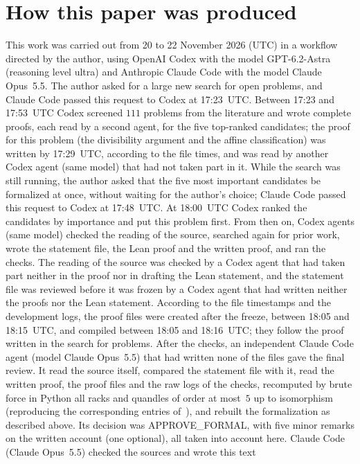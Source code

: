 \documentclass[11pt]{article}
\theoremstyle{definition}
\theoremstyle{remark}
\begin{document}
\section*{How this paper was produced}
This work was carried out from 20 to 22 November 2026 (UTC) in a workflow directed by
the author, using OpenAI Codex with the model GPT-6.2-Astra (reasoning level
ultra) and Anthropic Claude Code with the model Claude Opus~5.5. The author
asked for a large new search for open problems, and Claude Code passed this
request to Codex at 17:23~UTC. Between 17:23 and 17:53~UTC Codex screened
$111$ problems from the literature and wrote complete proofs, each read by a
second agent, for the five top-ranked candidates; the
proof for this problem (the divisibility argument and the affine
classification) was written by 17:29~UTC, according to the file times, and was
read by another Codex agent (same model) that had not taken part in it. While
the search was still running, the author asked that the five most important
candidates be formalized at once, without waiting for the author's choice;
Claude Code passed this request to Codex at 17:48~UTC. At 18:00~UTC Codex
ranked the candidates by importance and put this problem first. From then on,
Codex agents (same model) checked the reading of the source, searched again for
prior work, wrote the statement file, the Lean proof and the written proof,
and ran the checks. The reading of the source was checked by a Codex agent
that had taken part neither in the proof nor in drafting the Lean statement,
and the statement file was reviewed before it was frozen by a Codex agent that
had written neither the proofs nor the Lean statement. According to the file
timestamps and the development logs, the proof files were created after the
freeze, between 18:05 and 18:15~UTC, and compiled between 18:05 and
18:16~UTC; they follow the proof written in the search for problems. After the
checks, an independent Claude Code agent (model Claude Opus~5.5) that had
written none of the files gave the final review. It read the source itself,
compared the statement file with it, read the written proof, the proof files
and the raw logs of the checks, recomputed by brute force in Python all racks
and quandles of order at most~$5$ up to isomorphism (reproducing the
corresponding entries of~\cite[Tables~1 and~2]{vy}), and rebuilt the
formalization as described above. Its decision was APPROVE\_FORMAL, with five
minor remarks on the written account (one optional), all taken into account
here. Claude Code (Claude Opus~5.5) checked the sources and wrote this text
\end{document}
